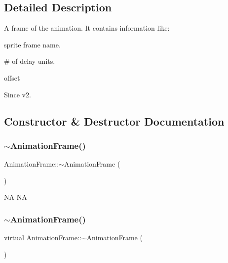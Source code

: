 \subsection{Detailed Description}
A frame of the animation. It contains information like\+:
\begin{DoxyItemize}
\item sprite frame name.
\item \# of delay units.
\item offset
\end{DoxyItemize}

\begin{DoxySince}{Since}
v2. 
\end{DoxySince}


\subsection{Constructor \& Destructor Documentation}
\mbox{\label{classAnimationFrame_af9da581313899adf881d6c1578cfa198}} 
\subsubsection{\texorpdfstring{$\sim$\+Animation\+Frame()}{~AnimationFrame()}\hspace{0.1cm}{\footnotesize\ttfamily [1/2]}}
{\footnotesize\ttfamily Animation\+Frame\+::$\sim$\+Animation\+Frame (\begin{DoxyParamCaption}{ }\end{DoxyParamCaption})\hspace{0.3cm}{\ttfamily [virtual]}}

NA  NA \mbox{\label{classAnimationFrame_a593ab6cb54f66bb9a31e9d0842ebccc4}} 
\subsubsection{\texorpdfstring{$\sim$\+Animation\+Frame()}{~AnimationFrame()}\hspace{0.1cm}{\footnotesize\ttfamily [2/2]}}
{\footnotesize\ttfamily virtual Animation\+Frame\+::$\sim$\+Animation\+Frame (\begin{DoxyParamCaption}{ }\end{DoxyParamCaption})\hspace{0.3cm}{\ttfamily [virtual]}}

